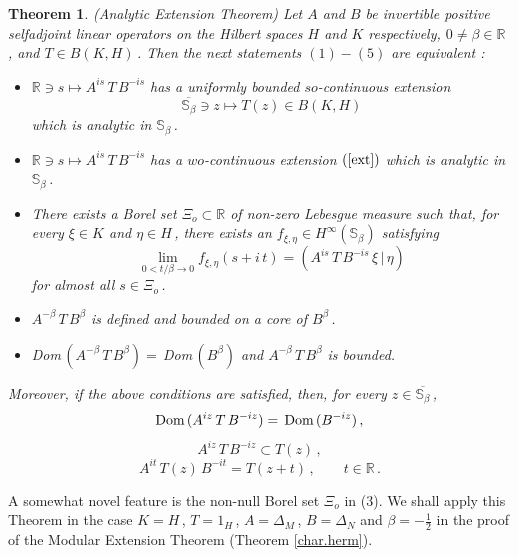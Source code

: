 \documentclass[reqno]{amsart}
\newtheorem{theorem}{Theorem}[section]
\theoremstyle{definition}
\theoremstyle{remark}
\numberwithin{equation}{section}
\theoremstyle{plain}
\begin{document}
\begin{theorem}\label{anal.ext}
{\rm (Analytic Extension Theorem)}
Let $A$ and $B$ be invertible positive selfadjoint linear operators
on the Hilbert spaces $H$ and $K$ respectively, $0\neq \beta\in
\mathbb R\,$, and $T\in B(K,H)\,$. Then the next statements
$(1) - (5)$ are equivalent {\rm :}
\begin{itemize}
\item[(1)] $\mathbb R\ni s\longmapsto A^{is}\, T\, B^{-is}$
has a uniformly bounded $so$-continuous extension
\begin{equation}\label{ext}
\overline{\mathbb S_\beta}\ni z\longmapsto T(z)\in B(K,H)
\end{equation}
which is analytic in $\mathbb S_\beta\,$.
\item[(2)] $\mathbb R\ni s\longmapsto A^{is}\, T\, B^{-is}$
has a $wo$-continuous extension $(\ref{ext})$ which is analytic in
$\mathbb S_\beta\,$.
\item[(3)] There exists a Borel set $\Xi_o\subset\mathbb R$ of non-zero
Lebesgue measure such that, for every $\xi\in K$ and $\eta\in H\,$,
there exists an $f_{\xi ,\eta}\in H^\infty (\mathbb S_\beta )$
satisfying
\begin{equation}\label{ae}
\lim_{0<t/\beta \to 0} f_{\xi ,\eta}(s+i\, t)=(A^{is}\, T\, B^{-is}\,
\xi\, |\,\eta )
\end{equation}
for almost all $s\in \Xi_o\,$.
\item[(4)] $A^{-\beta}\, T\, B^\beta$ is defined and bounded on a
core of $B^\beta\,$.
\item[(5)] {\rm Dom}$\, (A^{-\beta}\, T\, B^\beta )=
\,${\rm Dom}$\, (B^\beta)$ and $A^{-\beta}\, T\, B^\beta$ is bounded.
\end{itemize}
Moreover, if the above conditions are satisfied, then, for every
$z\in\overline{\mathbb S_\beta}\,$,
\begin{equation}\label{dom}
\text{\rm Dom}\, (A^{iz}\, T\, B^{-iz})=\,\text{\rm Dom}\, (B^{-iz})\, ,
\end{equation}
\begin{equation}\label{op}
A^{iz}\, T\, B^{-iz}\subset T(z)\, ,
\end{equation}
\begin{equation}\label{transl}
A^{it}\, T(z)\, B^{-it} =T(z+t)\, ,\qquad t\in\mathbb R\, .
\end{equation}
\end{theorem}
\smallskip

 A somewhat novel feature is the non-null
Borel set $\Xi_o$ in (3). We shall apply this Theorem in the case
$K=H\,$, $T=1_H\,$, $A=\Delta_M\,$, $B=\Delta_N$ and
$\beta =-\frac 12$ in the proof of the Modular Extension Theorem
(Theorem \ref{char.herm}).
\smallskip
\end{document}
